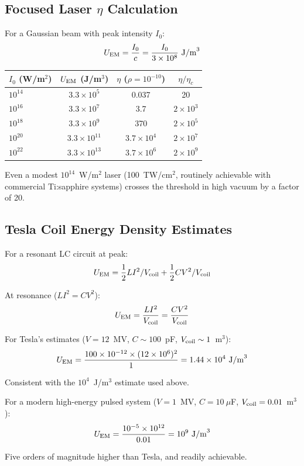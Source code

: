 \documentclass[12pt,a4paper]{article}
\begin{document}
\subsection{Focused Laser $\eta$ Calculation}

For a Gaussian beam with peak intensity $I_0$:
\begin{equation}
U_{\rm EM} = \frac{I_0}{c} = \frac{I_0}{3 \times 10^8}~\text{J/m}^3
\end{equation}

\begin{center}
\begin{tabular}{lccc}
\toprule
$I_0$ (W/m$^2$) & $U_{\rm EM}$ (J/m$^3$) & $\eta$ ($\rho = 10^{-10}$) & $\eta/\eta_c$ \\
\midrule
$10^{14}$ & $3.3 \times 10^5$ & 0.037 & 20 \\
$10^{16}$ & $3.3 \times 10^7$ & 3.7 & $2 \times 10^3$ \\
$10^{18}$ & $3.3 \times 10^9$ & 370 & $2 \times 10^5$ \\
$10^{20}$ & $3.3 \times 10^{11}$ & $3.7 \times 10^4$ & $2 \times 10^7$ \\
$10^{22}$ & $3.3 \times 10^{13}$ & $3.7 \times 10^6$ & $2 \times 10^9$ \\
\bottomrule
\end{tabular}
\end{center}

Even a modest $10^{14}$~W/m$^2$ laser (100~TW/cm$^2$, routinely achievable
with commercial Ti:sapphire systems) crosses the threshold in high vacuum by
a factor of 20.

\subsection{Tesla Coil Energy Density Estimates}

For a resonant LC circuit at peak:
\begin{equation}
U_{\rm EM} = \frac{1}{2}LI^2/V_{\rm coil} + \frac{1}{2}CV^2/V_{\rm coil}
\end{equation}

At resonance ($LI^2 = CV^2$):
\begin{equation}
U_{\rm EM} = \frac{LI^2}{V_{\rm coil}} = \frac{CV^2}{V_{\rm coil}}
\end{equation}

For Tesla's estimates ($V = 12$~MV, $C \sim 100$~pF, $V_{\rm coil} \sim 1$~m$^3$):
\begin{equation}
U_{\rm EM} = \frac{100 \times 10^{-12} \times (12 \times 10^6)^2}{1}
= 1.44 \times 10^4~\text{J/m}^3
\end{equation}

Consistent with the $10^4$~J/m$^3$ estimate used above.

For a modern high-energy pulsed system ($V = 1$~MV, $C = 10~\mu$F,
$V_{\rm coil} = 0.01$~m$^3$):
\begin{equation}
U_{\rm EM} = \frac{10^{-5} \times 10^{12}}{0.01} = 10^9~\text{J/m}^3
\end{equation}

Five orders of magnitude higher than Tesla, and readily achievable.
\end{document}

